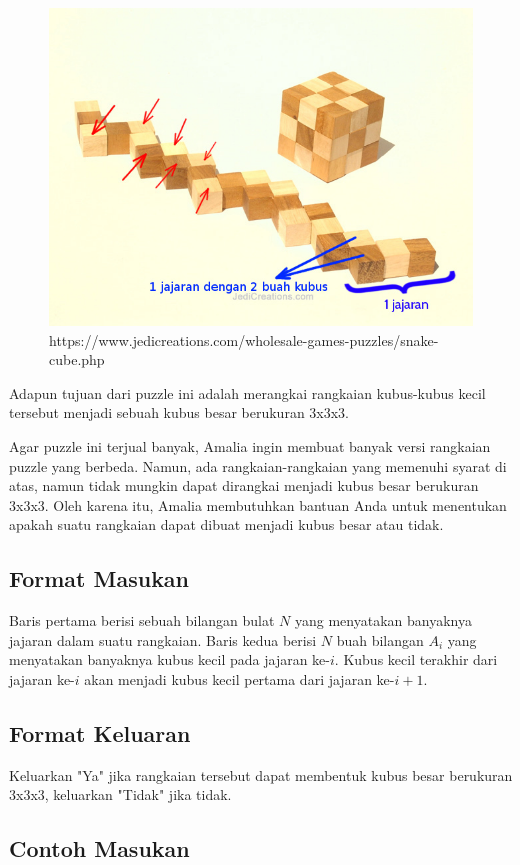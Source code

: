 \documentclass{article}
\begin{document}
\begin{itemize}
  \begin{figure}[h!]
    \centering
    \includegraphics[width=0.4\linewidth]{contoh-1.jpg}
    \caption{https://www.jedicreations.com/wholesale-games-puzzles/snake-cube.php}
  \end{figure}

\end{itemize}

\par\noindent Adapun tujuan dari puzzle ini adalah merangkai rangkaian kubus-kubus kecil tersebut menjadi sebuah kubus besar berukuran 3x3x3.

\par\noindent Agar puzzle ini terjual banyak, Amalia ingin membuat banyak versi rangkaian puzzle yang berbeda. Namun, ada rangkaian-rangkaian yang memenuhi syarat di atas, namun tidak mungkin dapat dirangkai menjadi kubus besar berukuran 3x3x3. Oleh karena itu, Amalia membutuhkan bantuan Anda untuk menentukan apakah suatu rangkaian dapat dibuat menjadi kubus besar atau tidak.

\subsection*{Format Masukan}

\par\noindent Baris pertama berisi sebuah bilangan bulat $N$ yang menyatakan banyaknya jajaran dalam suatu rangkaian. Baris kedua berisi $N$ buah bilangan $A_i$ yang menyatakan banyaknya kubus kecil pada jajaran ke-$i$. Kubus kecil terakhir dari jajaran ke-$i$ akan menjadi kubus kecil pertama dari jajaran ke-$i+1$.

\subsection*{Format Keluaran}

\par\noindent Keluarkan "Ya" jika rangkaian tersebut dapat membentuk kubus besar berukuran 3x3x3, keluarkan "Tidak" jika tidak.

\subsection*{Contoh Masukan}
\end{document}
